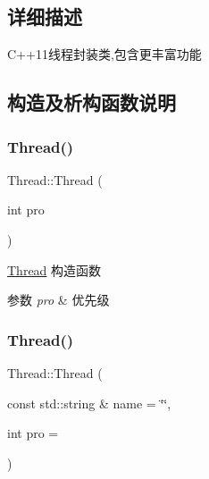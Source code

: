 \subsection{详细描述}
C++11线程封装类,包含更丰富功能 

\subsection{构造及析构函数说明}
\mbox{\label{classThread_a66350772ff3af06962db113658a72ae3}} 
\subsubsection{\texorpdfstring{Thread()}{Thread()}\hspace{0.1cm}{\footnotesize\ttfamily [1/3]}}
{\footnotesize\ttfamily Thread\+::\+Thread (\begin{DoxyParamCaption}\item[{int}]{pro }\end{DoxyParamCaption})\hspace{0.3cm}{\ttfamily [inline]}}



\hyperlink{classThread}{Thread} 构造函数 


\begin{DoxyParams}{参数}
{\em pro} & 优先级 \\
\hline
\end{DoxyParams}
\mbox{\label{classThread_a038819a1ef7bb4e50ae580d477f1a3b0}} 
\subsubsection{\texorpdfstring{Thread()}{Thread()}\hspace{0.1cm}{\footnotesize\ttfamily [2/3]}}
{\footnotesize\ttfamily Thread\+::\+Thread (\begin{DoxyParamCaption}\item[{const std\+::string \&}]{name = {\ttfamily \char`\"{}\char`\"{}},  }\item[{int}]{pro = {} }\end{DoxyParamCaption})\hspace{0.3cm}{\ttfamily [inline]}}



